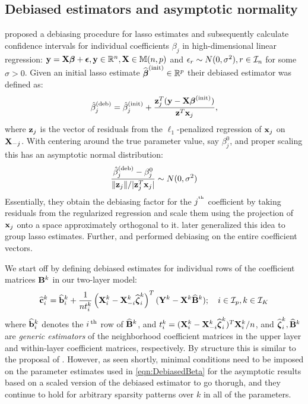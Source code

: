 \subsection{Debiased estimators and asymptotic normality}
\label{sec:testing-subsec-1}
\cite{ZhangZhang14} proposed a debiasing procedure for lasso estimates and subsequently calculate confidence intervals for individual coefficients $\beta_j$ in high-dimensional linear regression: ${\bf{y}} = {\mathbf{X}} {\boldsymbol{\beta}} + {\boldsymbol{\epsilon}}, {\bf{y}} \in {\mathbb{R}}^n, {\mathbf{X}} \in {\mathbb{M}}(n,p)$ and $\epsilon_r \sim N(0,\sigma^2), r \in {\cal{I}}_n$ for some $\sigma>0$. Given an initial lasso estimate $\widehat {{\boldsymbol{\beta}}}^{\text{(init)}} \in {\mathbb{R}}^p$ their debiased estimator was defined as:
%
$$
\hat \beta_j^{(\text{deb})} = \hat \beta_j^{(\text{init})} + \frac{{\bf{z}}_j^T ( {\bf{y}} - {\mathbf{X}} {\boldsymbol{\beta}}^{(\text{init})})}{{\bf{z}}^T {\bf{x}}_j},
$$
%
where ${\bf{z}}_j$ is the vector of residuals from the $\ell_1$-penalized regression of ${\bf{x}}_j$ on ${\mathbf{X}}_{-j}$. With centering around the true parameter value, say $\beta_j^0$, and proper scaling this has an asymptotic normal distribution:
%
$$
\frac{\hat \beta_j^{(\text{deb})} - \beta_j^0}{\| {\bf{z}}_j \|/| {\bf{z}}_j^T {\bf{x}}_j |} \sim N(0, \sigma^2)
$$
%
Essentially, they obtain the debiasing factor for the $j^{\operatorname*{^{\text{th}}}}$ coefficient by taking residuals from the regularized regression and scale them using the projection of ${\bf{x}}_j$ onto a space approximately orthogonal to it. \cite{MitraZhang16} later generalized this idea to group lasso estimates. Further, \cite{vanDeGeerEtal14} and \cite{JavanmardMontanari14} performed debiasing on the entire coefficient vectors.

We start off by defining debiased estimates for individual rows of the coefficient matrices ${\mathbf{B}}^k$ in our two-layer model:
%
\begin{align}\label{eqn:DebiasedBeta}
\widehat {{\bf{c}}}_i^k = \widehat {{\bf{b}}}_i^k + \frac{1}{n t_i^k} \left( {\mathbf{X}}_i^k - {\mathbf{X}}_{-i}^k \widehat {{\boldsymbol{\zeta}}}_i^k \right)^T ({\mathbf{Y}}^k - {\mathbf{X}}^k \widehat {{\mathbf{B}}}^k )
; \quad i \in {\cal{I}}_p, k \in {\cal{I}}_K
\end{align}
%
where $\widehat {{\bf{b}}}_i^k$ denotes the $i\operatorname*{^{\text{th}}}$ row of $\widehat {{\mathbf{B}}}^k$, and $t_i^k = ( {\mathbf{X}}_i^k - {\mathbf{X}}_{-i}^k \widehat {{\boldsymbol{\zeta}}}_i^k )^T {\mathbf{X}}_{i}^k/n$, and $\widehat {{\boldsymbol{\zeta}}}_i^k, \widehat {{\mathbf{B}}}^k$ are {\it generic estimators} of the neighborhood coefficient matrices in the upper layer and within-layer coefficient matrices, respectively. By structure this is similar to the proposal of \cite{ZhangZhang14}. However, as seen shortly, minimal conditions need to be imposed on the parameter estimates used in \eqref{eqn:DebiasedBeta} for the asymptotic results based on a scaled version of the debiased estimator to go thorugh, and they continue to hold for arbitrary sparsity patterns over $k$ in all of the parameters.

